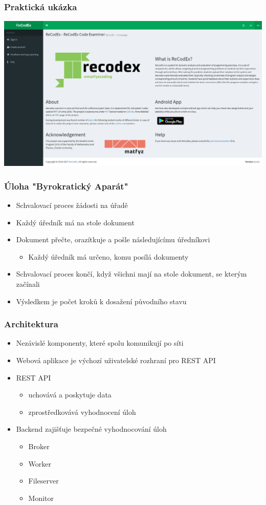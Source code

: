 \documentclass{beamer}
\begin{document}
\begin{frame}
	\frametitle{Praktická ukázka}
	\begin{center}
		\includegraphics[width=1\textwidth]{images/recodex-screen.png}
	\end{center}
\end{frame}

\begin{frame}
	\frametitle{Úloha "Byrokratický Aparát"}
	\begin{itemize}
		\item Schvalovací proces žádosti na úřadě
		\item Každý úředník má na stole dokument
		\item Dokument přečte, orazítkuje a pošle následujícímu úředníkovi
		\begin{itemize}
			\item Každý úředník má určeno, komu posílá dokumenty
		\end{itemize}
		\item Schvalovací proces končí, když všichni mají na stole dokument, se kterým začínali
		\item Výsledkem je počet kroků k dosažení původního stavu
	\end{itemize}
\end{frame}

\begin{frame}
	\frametitle{Architektura}
	\begin{itemize}
		\item Nezávislé komponenty, které spolu komunikují po síti
		\item Webová aplikace je výchozí uživatelské rozhraní pro REST API
		\item REST API 
			\begin{itemize}
				\item uchovává a poskytuje data
				\item zprostředkovává vyhodnocení úloh
			\end{itemize}
		\item Backend zajišťuje bezpečné vyhodnocování úloh
		\begin{itemize}
			\item Broker
			\item Worker
			\item Fileserver
			\item Monitor
		\end{itemize}
	\end{itemize}
\end{frame}
\end{document}
